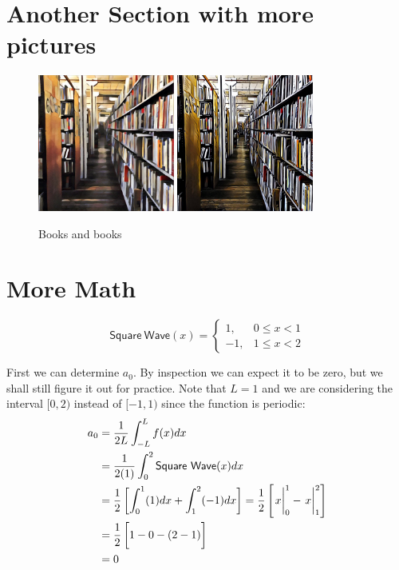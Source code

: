 \documentclass[11pt,letterpaper,twoside]{book}
\begin{document}
\lipsum[10-11]

\section{Another Section with more pictures}

\lipsum[12-13]

\begin{figure}
\centering
\includegraphics[width=0.4\textwidth]{BooksPic1}
\qquad
\includegraphics[width=0.4\textwidth]{BooksPic2}
\caption{\label{fig:path}Books and books}
\end{figure}

\lipsum[13-14]

\section{More Math}

\lipsum[15-16]

\[
\mathsf{Square\ Wave}(x) = \left\{ 
      \begin{array}{ll} 1, & 0 \leq x < 1 \\ 
                       -1, & 1 \leq x < 2 \end{array} \right.
\]

First we can determine $a_0$.  By inspection we can expect it to be zero, but we shall still 
figure it out for practice.  Note that $L = 1$ and we are considering the interval $[0, 2)$ instead
of $[-1, 1)$ since the function is periodic:
\begin{align*}
a_0 &= \frac{1}{2L} \int_{-L}^L f(x) dx  \\
    &= \frac{1}{2(1)} \int_{0}^{2} \mathsf{Square\ Wave}(x) dx \\
    &= \frac{1}{2} \left[ \int_0^1 (1) dx + \int_1^2 (-1) dx \right] = \frac{1}{2} \left[ \left. \vphantom{\frac{1}{2}} x\right|^1_0 - \left. \vphantom{\frac{1}{2}} x\right|^2_1 \right] \\
    &= \frac{1}{2} \left[ \vphantom{\frac{1}{2}} 1 - 0 - (2 - 1) \right] \\
    &= 0
\end{align*}
\end{document}

